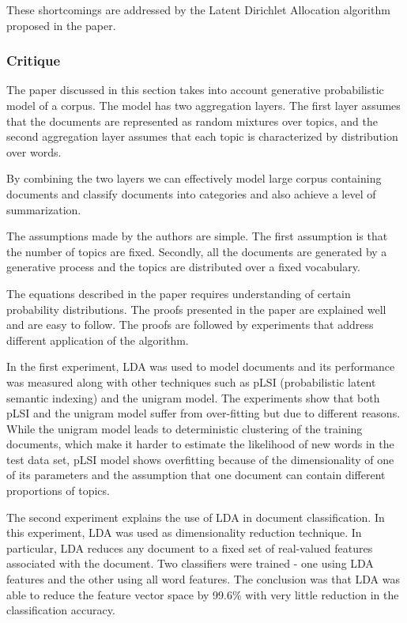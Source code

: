 \documentclass{article}
\begin{document}
These shortcomings are addressed by the Latent Dirichlet Allocation algorithm proposed in the paper. 

\subsubsection{Critique}

The paper discussed in this section takes into account generative probabilistic model of a corpus. The model has two aggregation layers. The first layer assumes that the documents are represented as random mixtures over topics, and the second aggregation layer assumes that each topic is characterized by distribution over words. 

By combining the two layers we can effectively model large corpus containing documents and classify documents into categories and also achieve a level of summarization. 

The assumptions made by the authors are simple. The first assumption is that the number of topics are fixed. Secondly, all the documents are generated by a generative process and the topics are distributed over a fixed vocabulary.

The equations described in the paper requires understanding of certain probability distributions. The proofs presented in the paper are explained well and are easy to follow. The proofs are followed by experiments that address different application of the algorithm. 

In the first experiment, LDA was used to model documents and its performance was measured along with other techniques such as pLSI (probabilistic latent semantic indexing) and the unigram model. The experiments show that both pLSI and the unigram model suffer from over-fitting but due to different reasons. While the unigram model leads to deterministic clustering of the training documents, which make it harder to estimate the likelihood of new words in the test data set, pLSI model shows overfitting because of the dimensionality of one of its parameters and the assumption that one document can contain different proportions of topics. 

The second experiment explains the use of LDA in document classification. In this experiment, LDA was used as dimensionality reduction technique. In particular, LDA reduces any document to a fixed set of real-valued features associated with the document. 
Two classifiers were trained - one using LDA features and the other using all word features.
The conclusion was that LDA was able to reduce the feature vector space by 99.6\% with very little reduction in the classification accuracy. 
\end{document}
